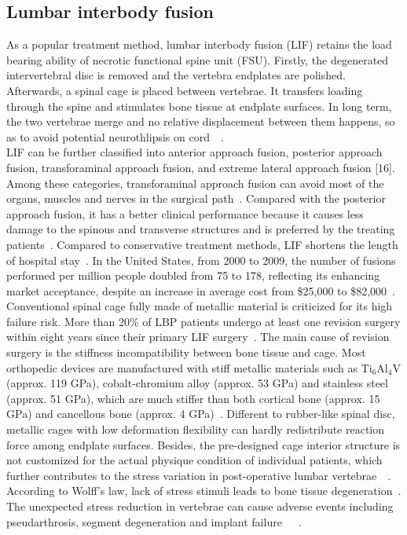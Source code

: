 \documentclass[12pt]{extbook}
\begin{document}
\subsection{Lumbar interbody fusion}

As a popular treatment method, lumbar interbody fusion (LIF) retains the load bearing ability of necrotic functional spine unit (FSU). Firstly, the degenerated intervertebral disc is removed and the vertebra endplates are polished. Afterwards, a spinal cage is placed between vertebrae. It transfers loading through the spine and stimulates bone tissue at endplate surfaces. In long term, the two vertebrae merge and no relative displacement between them happens, so as to avoid potential neurothlipsis on cord~\cite{mobbs2015lumbar}~\cite{yavin2017lumbar}.\\

LIF can be further classified into anterior approach fusion, posterior approach fusion, transforaminal approach fusion, and extreme lateral approach fusion [16]. Among these categories, transforaminal approach fusion can avoid most of the organs, muscles and nerves in the surgical path~\cite{mobbs2015lumbar}. Compared with the posterior approach fusion, it has a better clinical performance because it causes less damage to the spinous and transverse structures and is preferred by the treating patients~\cite{mobbs2015lumbar}. Compared to conservative treatment methods, LIF shortens the length of hospital stay~\cite{mobbs2015lumbar}. In the United States, from 2000 to 2009, the number of fusions performed per million people doubled from 75 to 178, reflecting its enhancing market acceptance, despite an increase in average cost from \$25,000 to \$82,000~\cite{yavin2017lumbar}.\\

Conventional spinal cage fully made of metallic material is criticized for its high failure risk. More than 20\% of LBP patients undergo at least one revision surgery within eight years since their primary LIF surgery~\cite{abdu2018long}. The main cause of revision surgery is the stiffness incompatibility between bone tissue and cage. Most orthopedic devices are manufactured with stiff metallic materials such as Ti$_6$Al$_4$V (approx. 119 GPa), cobalt-chromium alloy (approx. 53 GPa) and stainless steel (approx. 51 GPa), which are much stiffer than both cortical bone (approx. 15 GPa) and cancellous bone (approx. 4 GPa)~\cite{warburton2020biomaterials}. Different to rubber-like spinal disc, metallic cages with low deformation flexibility can hardly redistribute reaction force among endplate surfaces. Besides, the pre-designed cage interior structure is not customized for the actual physique condition of individual patients, which further contributes to the stress variation in post-operative lumbar vertebrae~\cite{reid2019state}~\cite{jain2016advances}. According to Wolff's law, lack of stress stimuli leads to bone tissue degeneration~\cite{wolff1893gesetz}. The unexpected stress reduction in vertebrae can cause adverse events including pseudarthrosis, segment degeneration and implant failure~\cite{williams2005ct}~\cite{pimenta2012biomechanics}~\cite{pichelmann2010revision}.\\
\end{document}
